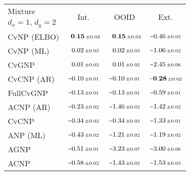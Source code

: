 \begin{tabular}[t]{lccc} 
\toprule 
Mixture & \multirow{2}{*}{Int.} & \multirow{2}{*}{OOID} & \multirow{2}{*}{Ext.} \\ 
$d_x\!=\!1,\,d_y\!=\!2$ \\ \midrule 
CvNP (ELBO) & $\hphantom{\scalebox{0.7}[1]{$-$}}\mathbf{0.15}\,{ \scriptstyle \pm  0.03 }$ & $\hphantom{\scalebox{0.7}[1]{$-$}}\mathbf{0.15}\,{ \scriptstyle \pm  0.03 }$ & $\scalebox{0.7}[1]{$-$}0.46\,{ \scriptstyle \pm  0.03 }$ \\ 
CvNP (ML) & $\hphantom{\scalebox{0.7}[1]{$-$}}0.02\,{ \scriptstyle \pm  0.03 }$ & $\hphantom{\scalebox{0.7}[1]{$-$}}0.02\,{ \scriptstyle \pm  0.03 }$ & $\scalebox{0.7}[1]{$-$}1.06\,{ \scriptstyle \pm  0.02 }$ \\ 
CvGNP & $\hphantom{\scalebox{0.7}[1]{$-$}}0.01\,{ \scriptstyle \pm  0.02 }$ & $\hphantom{\scalebox{0.7}[1]{$-$}}0.01\,{ \scriptstyle \pm  0.02 }$ & $\scalebox{0.7}[1]{$-$}2.45\,{ \scriptstyle \pm  0.06 }$ \\ 
CvCNP (AR) & $\scalebox{0.7}[1]{$-$}0.10\,{ \scriptstyle \pm  0.01 }$ & $\scalebox{0.7}[1]{$-$}0.10\,{ \scriptstyle \pm  0.01 }$ & $\mathbf{\scalebox{0.7}[1]{$-$}0.28}\,{ \scriptstyle \pm  0.02 }$ \\ 
FullCvGNP & $\scalebox{0.7}[1]{$-$}0.13\,{ \scriptstyle \pm  0.01 }$ & $\scalebox{0.7}[1]{$-$}0.13\,{ \scriptstyle \pm  0.01 }$ & $\scalebox{0.7}[1]{$-$}0.59\,{ \scriptstyle \pm  0.01 }$ \\ 
ACNP (AR) & $\scalebox{0.7}[1]{$-$}0.23\,{ \scriptstyle \pm  0.02 }$ & $\scalebox{0.7}[1]{$-$}1.46\,{ \scriptstyle \pm  0.02 }$ & $\scalebox{0.7}[1]{$-$}1.42\,{ \scriptstyle \pm  0.02 }$ \\ 
CvCNP & $\scalebox{0.7}[1]{$-$}0.34\,{ \scriptstyle \pm  0.02 }$ & $\scalebox{0.7}[1]{$-$}0.34\,{ \scriptstyle \pm  0.02 }$ & $\scalebox{0.7}[1]{$-$}1.33\,{ \scriptstyle \pm  0.01 }$ \\ 
ANP (ML) & $\scalebox{0.7}[1]{$-$}0.43\,{ \scriptstyle \pm  0.02 }$ & $\scalebox{0.7}[1]{$-$}1.21\,{ \scriptstyle \pm  0.02 }$ & $\scalebox{0.7}[1]{$-$}1.19\,{ \scriptstyle \pm  0.02 }$ \\ 
AGNP & $\scalebox{0.7}[1]{$-$}0.51\,{ \scriptstyle \pm  0.01 }$ & $\scalebox{0.7}[1]{$-$}3.23\,{ \scriptstyle \pm  0.07 }$ & $\scalebox{0.7}[1]{$-$}3.00\,{ \scriptstyle \pm  0.06 }$ \\ 
ACNP & $\scalebox{0.7}[1]{$-$}0.58\,{ \scriptstyle \pm  0.02 }$ & $\scalebox{0.7}[1]{$-$}1.43\,{ \scriptstyle \pm  0.02 }$ & $\scalebox{0.7}[1]{$-$}1.53\,{ \scriptstyle \pm  0.03 }$ \\ 

\end{tabular}
